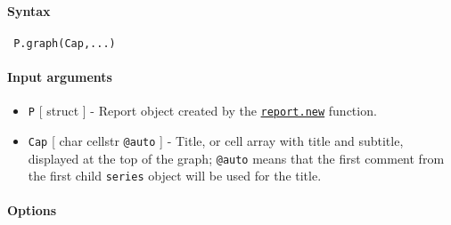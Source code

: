 


	\paragraph{Syntax}
 
 \begin{verbatim}
 P.graph(Cap,...)
 \end{verbatim}
 
 \paragraph{Input arguments}
 
 \begin{itemize}
 \item
   \texttt{P} {[} struct {]} - Report object created by the
   \href{report/new}{\texttt{report.new}} function.
 \item
   \texttt{Cap} {[} char \textbar{} cellstr \textbar{} \texttt{@auto} {]}
   - Title, or cell array with title and subtitle, displayed at the top
   of the graph; \texttt{@auto} means that the first comment from the
   first child \texttt{series} object will be used for the title.
 \end{itemize}
 
 \paragraph{Options}
 
